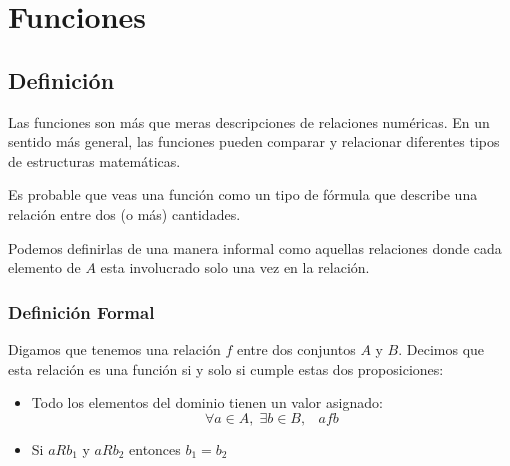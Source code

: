 \documentclass[12pt, fleqn]{report}                             %
\DeclareMathOperator \Space     {\quad}                         %
\DeclareMathOperator \MiniSpace {\;}                            %
\theoremstyle{break}                                            %
\begin{document}
    \chapter{Funciones}
        \clearpage    



        \section{Definición}

            Las funciones son más que meras descripciones de relaciones numéricas. En un sentido más general,
            las funciones pueden comparar y relacionar diferentes tipos de estructuras matemáticas.

            Es probable que veas una función como un tipo de fórmula que describe una relación entre dos
            (o más) cantidades.

            Podemos definirlas de una manera informal como aquellas relaciones donde cada elemento de $A$ 
            esta involucrado solo una vez en la relación.

            \subsection*{Definición Formal}

                Digamos que tenemos una relación $f$ entre dos conjuntos $A$ y $B$.
                Decimos que esta relación es una función si y solo si cumple estas dos proposiciones:

                \begin{itemize}
                    \item Todo los elementos del dominio tienen un valor asignado:
                        \begin{equation*}
                            \forall a \in A, \; \exists b \in B, \MiniSpace afb
                        \end{equation*}

                    \item Si $aRb_1$ y $aRb_2$ entonces $b_1 = b_2$

                \end{itemize}
\end{document}
